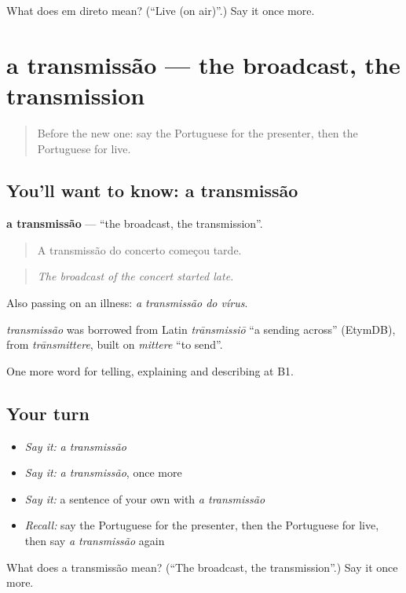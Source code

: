 \begin{tcolorbox}[breakable,colback=teal!4,colframe=teal!35!black,title={Before you move on}]
What does em direto mean? (\textquotedblleft{}Live (on air)\textquotedblright{}.) Say it once more.
\end{tcolorbox}
\section[a transmissão]{a transmissão — the broadcast, the transmission}

\label{lesson:PT-C278-transmissao}



\begin{quote}
Before the new one: say the Portuguese for the presenter, then the Portuguese for live.
\end{quote}

\subsection*{You'll want to know: a transmissão}
\textbf{a transmissão} — \textquotedblleft{}the broadcast, the transmission\textquotedblright{}.

\begin{quote}
A transmissão do concerto começou tarde.
\end{quote}

\begin{quote}
\emph{The broadcast of the concert started late.}
\end{quote}

Also passing on an illness: \emph{a transmissão do vírus}.

\begin{cousinweb}
\emph{transmissão} was borrowed from Latin \emph{trānsmissiō} \textquotedblleft{}a sending across\textquotedblright{} (EtymDB), from \emph{trānsmittere}, built on \emph{mittere} \textquotedblleft{}to send\textquotedblright{}.
\end{cousinweb}

\begin{grammarlens}[title={What you've built}]
One more word for telling, explaining and describing at B1.
\end{grammarlens}

\subsection*{Your turn}
\begin{itemize}
\raggedright
  \item \emph{Say it:} \emph{a transmissão}
  \item \emph{Say it:} \emph{a transmissão}, once more
  \item \emph{Say it:} a sentence of your own with \emph{a transmissão}
  \item \emph{Recall:} say the Portuguese for the presenter, then the Portuguese for live, then say \emph{a transmissão} again
\end{itemize}

\begin{tcolorbox}[breakable,colback=teal!4,colframe=teal!35!black,title={Before you move on}]
What does a transmissão mean? (\textquotedblleft{}The broadcast, the transmission\textquotedblright{}.) Say it once more.
\end{tcolorbox}
